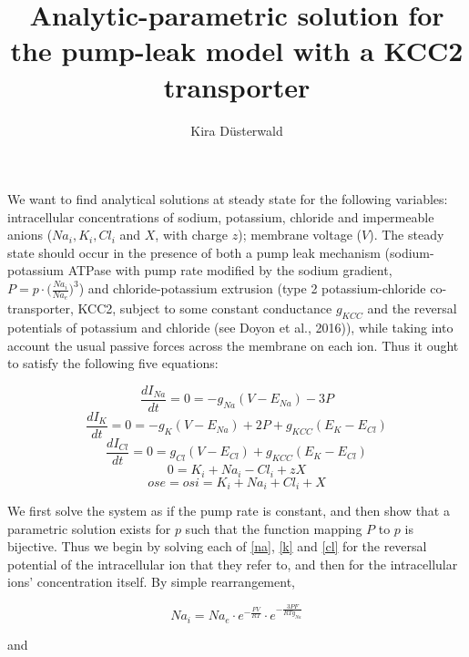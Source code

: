 \documentclass[a4paper,11pt]{article}
\title{Analytic-parametric solution for the pump-leak model with a KCC2 transporter}
\author{Kira D\"usterwald}
\begin{document}
\maketitle

We want to find analytical solutions at steady state for the following variables: intracellular concentrations of sodium, potassium, chloride and impermeable anions ($Na_i, K_i, Cl_i$ and $X$, with charge $z$); membrane voltage ($V$). The steady state should occur in the presence of both a pump leak mechanism (sodium-potassium ATPase with pump rate modified by the sodium gradient, $P=p\cdot\Big(\frac{Na_i}{Na_e}\Big)^3$) and chloride-potassium extrusion (type 2 potassium-chloride co-transporter, KCC2, subject to some constant conductance $g_{KCC}$ and the reversal potentials of potassium and chloride (see Doyon et al., 2016)), while taking into account the usual passive forces across the membrane on each ion. Thus it ought to satisfy the following five equations:

\begin{equation} \label{na}
\frac{dI_{Na}}{dt} =0= -g_{Na}(V-E_{Na})-3P
\end{equation}
\begin{equation} \label{k}
\frac{dI_{K}}{dt} =0= -g_K(V-E_{Na})+2P+g_{KCC}(E_K-E_{Cl})
\end{equation}
\begin{equation} \label{cl}
\frac{dI_{Cl}}{dt} =0= g_{Cl}(V-E_{Cl})+g_{KCC}(E_K-E_{Cl})
\end{equation}
\begin{equation} \label{in}
0=K_i+Na_i-Cl_i+zX
\end{equation}
\begin{equation} \label{osmo}
ose = osi=K_i+Na_i+Cl_i+X
\end{equation}

We first solve the system as if the pump rate is constant, and then show that a parametric solution exists for $p$ such that the function mapping $P$ to $p$ is bijective. Thus we begin by solving each of \eqref{na}, \eqref{k} and \eqref{cl} for the reversal potential of the intracellular ion that they refer to, and then for the intracellular ions' concentration itself. By simple rearrangement,

\begin{equation} \label{nai}
Na_i = Na_e \cdot e^{-\frac{FV}{RT}} \cdot e^{-\frac{3PF}{RTg_{Na}}} 
\end{equation}

and
\end{document}
